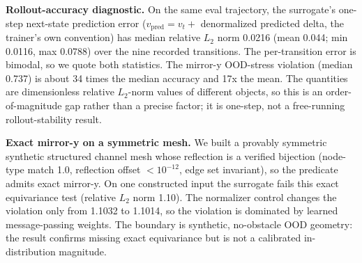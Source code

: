 \documentclass[preprint,12pt,authoryear]{elsarticle}
\begin{document}
\textbf{Rollout-accuracy diagnostic.} On the same eval trajectory, the surrogate's one-step next-state prediction error ($v_\mathrm{pred}=v_t+$ denormalized predicted delta, the trainer's own convention) has median relative \(L_2\) norm 0.0216 (mean 0.044; min 0.0116, max 0.0788) over the nine recorded transitions. The per-transition error is bimodal, so we quote both statistics. The mirror-y OOD-stress violation (median 0.737) is about 34 times the median accuracy and 17x the mean. The quantities are dimensionless relative \(L_2\)-norm values of different objects, so this is an order-of-magnitude gap rather than a precise factor; it is one-step, not a free-running rollout-stability result.

\textbf{Exact mirror-y on a symmetric mesh.} We built a provably symmetric synthetic structured channel mesh whose reflection is a verified bijection (node-type match 1.0, reflection offset $<10^{-12}$, edge set invariant), so the predicate admits exact mirror-y. On one constructed input the surrogate fails this exact equivariance test (relative \(L_2\) norm 1.10). The normalizer control changes the violation only from 1.1032 to 1.1014, so the violation is dominated by learned message-passing weights. The boundary is synthetic, no-obstacle OOD geometry: the result confirms missing exact equivariance but is not a calibrated in-distribution magnitude.
\end{document}
